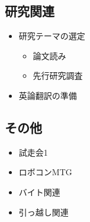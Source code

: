 \documentclass[uplatex, onecolumn, 10pt]{jsarticle}
\begin{document}
\subsection*{研究関連}
\begin{itemize}
    \item 研究テーマの選定
    \begin{itemize}
        \item 論文読み
        \item 先行研究調査
    \end{itemize}
    \item 英論翻訳の準備
\end{itemize}

\subsection*{その他}
\begin{itemize}
	\item 試走会1
    \item ロボコンMTG
    \item バイト関連
    \item 引っ越し関連
\end{itemize}
\end{document}
